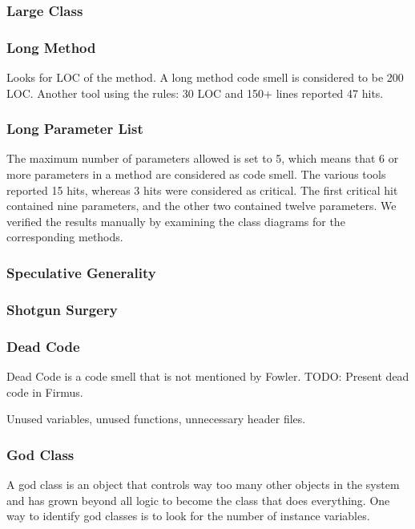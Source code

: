 \subsubsection{Large Class}

\subsubsection{Long Method}
Looks for LOC of the method. A long method code smell is considered to be 200 LOC. Another tool using the rules: 30 LOC and 150+ lines reported 47 hits. 



\subsubsection{Long Parameter List}
The maximum number of parameters allowed is set to 5, which means that 6 or more parameters in a method are considered as code smell. The various tools reported 15 hits, whereas 3 hits were considered as critical. The first critical hit contained nine parameters, and the other two contained twelve parameters. We verified the results manually by examining the class diagrams for the corresponding methods.

\subsubsection{Speculative Generality}

\subsubsection{Shotgun Surgery}


\subsubsection{Dead Code}
Dead Code is a code smell that is not mentioned by Fowler. TODO: Present dead code in Firmus.

Unused variables, unused functions, unnecessary header files. 

\subsubsection{God Class}
A god class is an object that controls way too many other objects in the system and has grown beyond all logic to become the class that does everything. One way to identify god classes is to look for the number of instance variables. 






